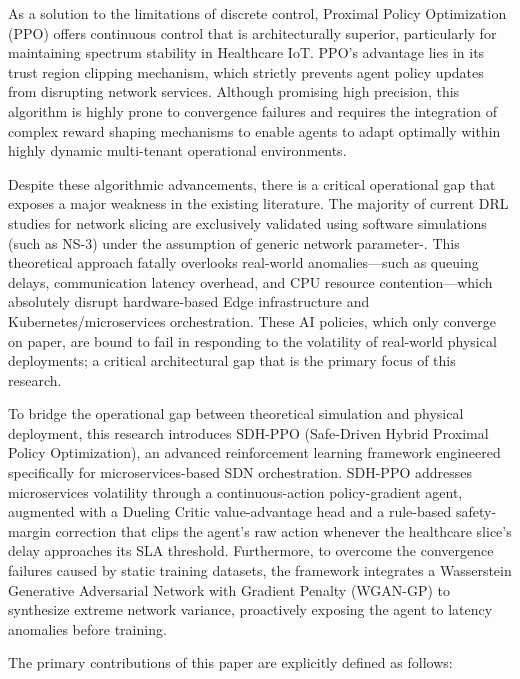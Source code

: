 \documentclass[conference]{IEEEtran}
\begin{document}
As a solution to the limitations of discrete control, Proximal Policy Optimization (PPO) offers continuous control that is architecturally superior, particularly for maintaining spectrum stability in Healthcare IoT\cite{b17}. PPO's advantage lies in its trust region clipping mechanism, which strictly prevents agent policy updates from disrupting network services. Although promising high precision, this algorithm is highly prone to convergence failures and requires the integration of complex reward shaping mechanisms to enable agents to adapt optimally within highly dynamic multi-tenant operational environments\cite{b18}.

Despite these algorithmic advancements, there is a critical operational gap that exposes a major weakness in the existing literature. The majority of current DRL studies for network slicing are exclusively validated using software simulations (such as NS-3) under the assumption of generic network parameter\cite{b15}-\cite{b20}. This theoretical approach fatally overlooks real-world anomalies---such as queuing delays, communication latency overhead, and CPU resource contention---which absolutely disrupt hardware-based Edge infrastructure and Kubernetes/microservices orchestration. These AI policies, which only converge on paper, are bound to fail in responding to the volatility of real-world physical deployments; a critical architectural gap that is the primary focus of this research.

To bridge the operational gap between theoretical simulation and physical deployment, this research introduces SDH-PPO (Safe-Driven Hybrid Proximal Policy Optimization), an advanced reinforcement learning framework engineered specifically for microservices-based SDN orchestration. SDH-PPO addresses microservices volatility through a continuous-action policy-gradient agent, augmented with a Dueling Critic value-advantage head and a rule-based safety-margin correction that clips the agent's raw action whenever the healthcare slice's delay approaches its SLA threshold. Furthermore, to overcome the convergence failures caused by static training datasets, the framework integrates a Wasserstein Generative Adversarial Network with Gradient Penalty (WGAN-GP) to synthesize extreme network variance, proactively exposing the agent to latency anomalies before training.

The primary contributions of this paper are explicitly defined as follows:
\end{document}
